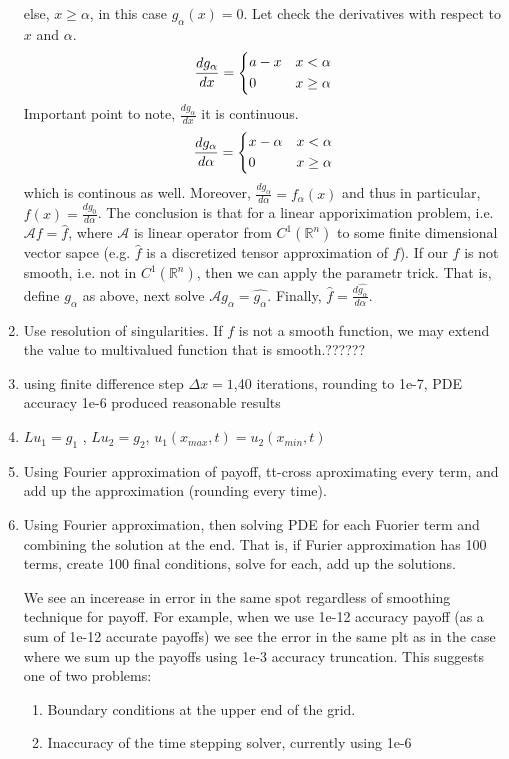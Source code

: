 \documentclass{article}
\newcommand{\R}{\mathbb{R}}
\begin{document}
\begin{enumerate}
    else, $x\geq\alpha$, in this case $g_\alpha(x)=0$.   
    Let check the derivatives with respect to $x$ and $\alpha$.
    \begin{align*}
        \frac{dg_\alpha}{dx} = \begin{dcases}
            a-x & x<\alpha\\
            0 & x\geq\alpha
        \end{dcases}
    \end{align*}    
    Important point to note, $\frac{dg_\alpha}{dx}$  it is continuous.
    \begin{align*}
        \frac{dg_\alpha}{d\alpha} = \begin{dcases}
            x-\alpha & x<\alpha\\
            0 & x\geq\alpha
        \end{dcases}
    \end{align*}    
    which is continous as well. Moreover, $\frac{dg_\alpha}{d\alpha}=f_\alpha(x)$ and 
    thus in particular, $f(x) = \frac{dg_0}{d\alpha}$. The conclusion is that 
    for a linear apporiximation problem, i.e. $\mathcal{A}f = \hat{f}$, where $\mathcal{A}$ is linear operator 
    from  $C^1(\R^n)$ to some finite dimensional vector sapce (e.g. $\hat{f}$ is a discretized tensor approximation of $f$).
    If our $f$ is not smooth, i.e. not in $C^1(\R^n)$, then we can apply the parametr trick.
    That is, define $g_\alpha$ as above, next solve $\mathcal{A}g_\alpha = \hat{g_\alpha}$.
    Finally, $\hat{f} = \frac{d\hat{g_\alpha}}{d\alpha}$.
    \item Use resolution of singularities. If $f$ is not a smooth function, we may 
    extend the value to multivalued function that is smooth.??????
    \item
    using finite difference step $\Delta x=1$,40 iterations, rounding to 1e-7, PDE accuracy 1e-6 produced reasonable results
    \item $Lu_1=g_1$ , $Lu_2=g_2$, $u_1(x_{max},t) = u_2(x_{min},t)$
    \item Using Fourier approximation of payoff, tt-cross aproximating every term, and add up the 
    approximation (rounding every time).
    \item Using Fourier approximation, then solving PDE for each Fuorier term and combining the solution
    at the end. That is, if Furier approximation has 100 terms, create 100 final conditions, 
    solve for each, add up the solutions.

    We see an incerease in error in the same spot regardless of smoothing technique for payoff. 
    For example, when we use 1e-12 accuracy payoff (as a sum of 1e-12 accurate payoffs)
    we see the error in the same plt as in the case where we sum up the payoffs using 1e-3 accuracy truncation.
    This suggests one of 
    two problems:
    \begin{enumerate}
        \item Boundary conditions at the upper end of the grid.
        \item Inaccuracy of the time stepping solver, currently using 1e-6
    \end{enumerate}

\end{enumerate}
\end{document}
